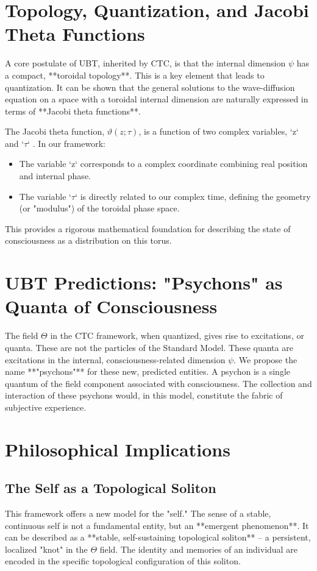 \documentclass[12pt, a4paper]{article}
\begin{document}
\section{Topology, Quantization, and Jacobi Theta Functions}
A core postulate of UBT, inherited by CTC, is that the internal dimension \( \psi \) has a compact, **toroidal topology**. This is a key element that leads to quantization. It can be shown that the general solutions to the wave-diffusion equation on a space with a toroidal internal dimension are naturally expressed in terms of **Jacobi theta functions**.

The Jacobi theta function, \(\vartheta(z; \tau)\), is a function of two complex variables, `z` and `\(\tau\)` \cite{Whittaker1927}. In our framework:
\begin{itemize}
    \item The variable `z` corresponds to a complex coordinate combining real position and internal phase.
    \item The variable `\(\tau\)` is directly related to our complex time, defining the geometry (or "modulus") of the toroidal phase space.
\end{itemize}
This provides a rigorous mathematical foundation for describing the state of consciousness as a distribution on this torus.

\section{UBT Predictions: "Psychons" as Quanta of Consciousness}
The field \( \Theta \) in the CTC framework, when quantized, gives rise to excitations, or quanta. These are not the particles of the Standard Model. These quanta are excitations in the internal, consciousness-related dimension \( \psi \). We propose the name **"psychons"** for these new, predicted entities. A psychon is a single quantum of the field component associated with consciousness. The collection and interaction of these psychons would, in this model, constitute the fabric of subjective experience.

\section{Philosophical Implications}

\subsection{The Self as a Topological Soliton}
This framework offers a new model for the "self." The sense of a stable, continuous self is not a fundamental entity, but an **emergent phenomenon**. It can be described as a **stable, self-sustaining topological soliton** – a persistent, localized "knot" in the \( \Theta \) field. The identity and memories of an individual are encoded in the specific topological configuration of this soliton.
\end{document}
